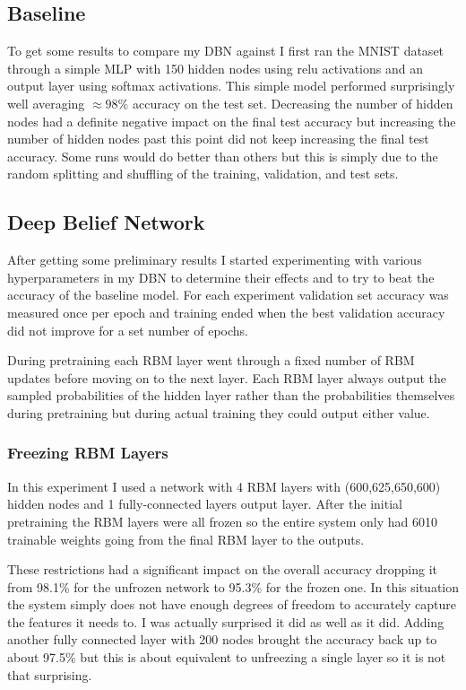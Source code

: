 \documentclass{article}
\begin{document}
	\subsection{Baseline}
	To get some results to compare my DBN against I first ran the MNIST dataset through a simple MLP with 150 hidden nodes using relu activations and an output layer using softmax activations. This simple model performed surprisingly well averaging $\approx 98\%$ accuracy on the test set. Decreasing the number of hidden nodes had a definite negative impact on the final test accuracy but increasing the number of hidden nodes past this point did not keep increasing the final test accuracy. Some runs would do better than others but this is simply due to the random splitting and shuffling of the training, validation, and test sets.
	
	\subsection{Deep Belief Network}
	After getting some preliminary results I started experimenting with various hyperparameters in my DBN to determine their effects and to try to beat the accuracy of the baseline model. For each experiment validation set accuracy was measured once per epoch and training ended when the best validation accuracy did not improve for a set number of epochs. 
	
	During pretraining each RBM layer went through a fixed number of RBM updates before moving on to the next layer. Each RBM layer always output the sampled probabilities of the hidden layer rather than the probabilities themselves during pretraining but during actual training they could output either value.
	
	\subsubsection{Freezing RBM Layers}
	In this experiment I used a network with 4 RBM layers with (600,625,650,600) hidden nodes and 1 fully-connected layers output layer. After the initial pretraining the RBM layers were all frozen so the entire system only had 6010 trainable weights going from the final RBM layer to the outputs. 
	
	These restrictions had a significant impact on the overall accuracy dropping it from 98.1\% for the unfrozen network to 95.3\% for the frozen one. In this situation the system simply does not have enough degrees of freedom to accurately capture the features it needs to. I was actually surprised it did as well as it did. Adding another fully connected layer with 200 nodes brought the accuracy back up to about 97.5\% but this is about equivalent to unfreezing a single layer so it is not that surprising.
\end{document}
